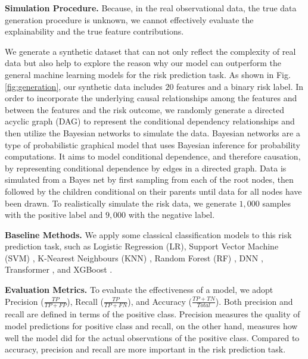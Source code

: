 \documentclass[letterpaper]{article} %
\theoremstyle{definition}
\theoremstyle{remark}
\begin{document}
\noindent\textbf{Simulation Procedure.}
Because, in the real observational data, the true data generation procedure is unknown, we cannot effectively evaluate the explainability and the true feature contributions.

We generate a synthetic dataset that can not only reflect the complexity of real data but also help to explore the reason why our model can outperform the general machine learning models for the risk prediction task. As shown in Fig. \ref{fig:generation}, our synthetic data includes $20$ features and a binary risk label. In order to incorporate the underlying causal relationships among the features and between the features and the risk outcome, we randomly generate a directed acyclic graph (DAG) to represent the conditional dependency relationships and then utilize the Bayesian networks \cite{heckerman2008tutorial} to simulate the data. Bayesian networks are a type of probabilistic graphical model that uses Bayesian inference for probability computations. It aims to model conditional dependence, and therefore causation, by representing conditional dependence by edges in a directed graph. Data is simulated from a Bayes net by first sampling from each of the root nodes, then followed by the children conditional on their parents until data for all nodes have been drawn. To realistically simulate the risk data, we generate $1,000$ samples with the positive label and $9,000$ with the negative label.


\noindent\textbf{Baseline Methods.} We apply some classical classification models to this risk prediction task, such as Logistic Regression (LR), Support Vector Machine (SVM) \cite{suykens1999least}, K-Nearest Neighbours (KNN) \cite{cunningham2021k}, Random Forest (RF) \cite{breiman2001random}, DNN \cite{larochelle2009exploring}, Transformer \cite{vaswani2017attention}, and XGBoost \cite{chen2016xgboost}.



\noindent\textbf{Evaluation Metrics.}
To evaluate the effectiveness of a model, we adopt Precision ($\frac{TP}{TP+FP}$), Recall ($\frac{TP}{TP+FN}$), and Accuracy ($\frac{TP+TN}{Total}$). Both precision and recall are defined in terms of the positive class. Precision measures the quality of model predictions for positive class and recall, on the other hand, measures how well the model did for the actual observations of the positive class. Compared to accuracy, precision and recall are more important in the risk prediction task.
\end{document}
